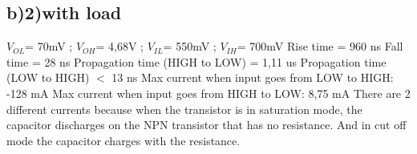 \subsection*{b)2)with load} 

$V_{OL}$= 70mV ; 
$V_{OH}$= 4,68V ; 
$V_{IL}$= 550mV ;
$V_{IH}$= 700mV
\newline
Rise time = 960 ns
\newline
Fall time = 28 ns
\newline
Propagation time (HIGH to LOW) = 1,11 us
\newline
Propagation time (LOW to HIGH) $<$ 13 ns
\newline
Max current when input goes from LOW to HIGH: -128 mA
\newline
Max current when input goes from HIGH to LOW: 8,75 mA
\newline
There are 2 different currents because when the transistor
 is in saturation mode, the capacitor discharges on the 
 NPN transistor that has no resistance. And in cut off
  mode the capacitor charges with the resistance.

